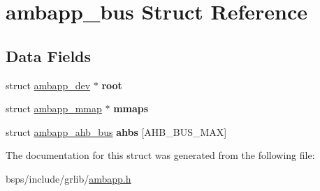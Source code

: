 \hypertarget{structambapp__bus}{}\section{ambapp\+\_\+bus Struct Reference}
\label{structambapp__bus}
\subsection*{Data Fields}
\begin{DoxyCompactItemize}
\item 
\mbox{\label{structambapp__bus_a3b7dd5c5edeffe3ac502fe726917e962}} 
struct \mbox{\hyperlink{structambapp__dev}{ambapp\+\_\+dev}} $\ast$ {\bfseries root}
\item 
\mbox{\label{structambapp__bus_a4b40062339e930aa15fb9bd4b33154a2}} 
struct \mbox{\hyperlink{structambapp__mmap}{ambapp\+\_\+mmap}} $\ast$ {\bfseries mmaps}
\item 
\mbox{\label{structambapp__bus_a1c8f44cdd884925b76292e28749a008f}} 
struct \mbox{\hyperlink{structambapp__ahb__bus}{ambapp\+\_\+ahb\+\_\+bus}} {\bfseries ahbs} \mbox{[}A\+H\+B\+\_\+\+B\+U\+S\+\_\+\+M\+AX\mbox{]}
\end{DoxyCompactItemize}


The documentation for this struct was generated from the following file\+:\begin{DoxyCompactItemize}
\item 
bsps/include/grlib/\mbox{\hyperlink{ambapp_8h}{ambapp.\+h}}\end{DoxyCompactItemize}
